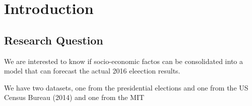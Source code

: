 
\chapter{Introduction} %

\label{Chapter1} %


\newcommand{\keyword}[1]{\textbf{#1}}
\newcommand{\tabhead}[1]{\textbf{#1}}
\newcommand{\code}[1]{\texttt{#1}}
\newcommand{\file}[1]{\texttt{\bfseries#1}}
\newcommand{\option}[1]{\texttt{\itshape#1}}


\section{Research Question}
We are interested to know if socio-economic factos can be consolidated into a model that can forecast the actual 2016 eleection results.

We have two datasets, one from the presidential elections and one from the US Census Bureau (2014) and one from the MIT \cite{MIT}


